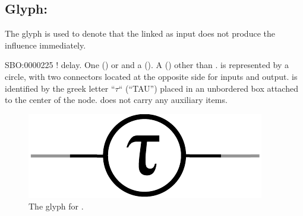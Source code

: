 
\subsection{Glyph: }\label{sec:delay}

The glyph  is used to denote that the  linked as input does not produce the influence immediately.

\begin{glyphDescription}
 \glyphSboTerm SBO:0000225 ! delay.
 \glyphOrigin One  () or and a  ().
 \glyphTarget A  () other than .
 \glyphContainer {} is represented by a circle, with two connectors located at the opposite side for inputs and output.
 \glyphLabel {} is identified by the greek letter ``$\tau$`` (``TAU'') placed in an unbordered box attached to the center of the node.
 \glyphAux {} does not carry any auxiliary items.
\end{glyphDescription}

\begin{figure}[H]
  \centering
  \includegraphics[scale = 0.5]{images/delay}
  \caption{The \AF glyph for .}
  \label{fig:delay}
\end{figure}
\normalcolor
